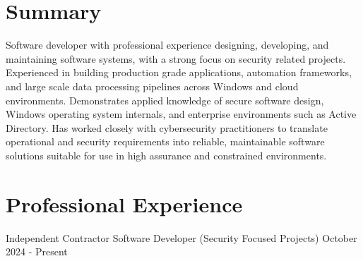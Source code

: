 \documentclass{../styles/cv}
\begin{document}
\populatedtitle

\section{Summary}
Software developer with professional experience designing, developing, and maintaining software systems, with a strong focus on security related projects. Experienced in building production grade applications, automation frameworks, and large scale data processing pipelines across Windows and cloud environments. Demonstrates applied knowledge of secure software design, Windows operating system internals, and enterprise environments such as Active Directory. Has worked closely with cybersecurity practitioners to translate operational and security requirements into reliable, maintainable software solutions suitable for use in high assurance and constrained environments.

\section{Professional Experience}

\subsectionpositiondate
    {Independent Contractor}
    {Software Developer (Security Focused Projects)}
    {October 2024 - Present}
\end{document}
